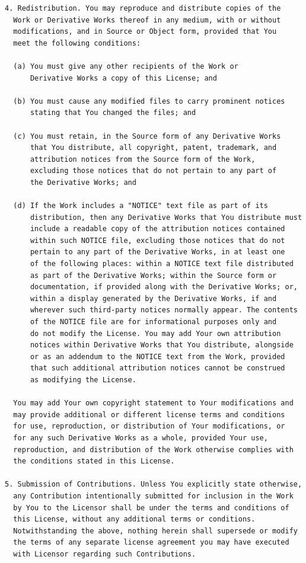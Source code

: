 \begin{verbatim}
4. Redistribution. You may reproduce and distribute copies of the
  Work or Derivative Works thereof in any medium, with or without
  modifications, and in Source or Object form, provided that You
  meet the following conditions:

  (a) You must give any other recipients of the Work or
      Derivative Works a copy of this License; and

  (b) You must cause any modified files to carry prominent notices
      stating that You changed the files; and

  (c) You must retain, in the Source form of any Derivative Works
      that You distribute, all copyright, patent, trademark, and
      attribution notices from the Source form of the Work,
      excluding those notices that do not pertain to any part of
      the Derivative Works; and

  (d) If the Work includes a "NOTICE" text file as part of its
      distribution, then any Derivative Works that You distribute must
      include a readable copy of the attribution notices contained
      within such NOTICE file, excluding those notices that do not
      pertain to any part of the Derivative Works, in at least one
      of the following places: within a NOTICE text file distributed
      as part of the Derivative Works; within the Source form or
      documentation, if provided along with the Derivative Works; or,
      within a display generated by the Derivative Works, if and
      wherever such third-party notices normally appear. The contents
      of the NOTICE file are for informational purposes only and
      do not modify the License. You may add Your own attribution
      notices within Derivative Works that You distribute, alongside
      or as an addendum to the NOTICE text from the Work, provided
      that such additional attribution notices cannot be construed
      as modifying the License.

  You may add Your own copyright statement to Your modifications and
  may provide additional or different license terms and conditions
  for use, reproduction, or distribution of Your modifications, or
  for any such Derivative Works as a whole, provided Your use,
  reproduction, and distribution of the Work otherwise complies with
  the conditions stated in this License.

5. Submission of Contributions. Unless You explicitly state otherwise,
  any Contribution intentionally submitted for inclusion in the Work
  by You to the Licensor shall be under the terms and conditions of
  this License, without any additional terms or conditions.
  Notwithstanding the above, nothing herein shall supersede or modify
  the terms of any separate license agreement you may have executed
  with Licensor regarding such Contributions.


\end{verbatim}
